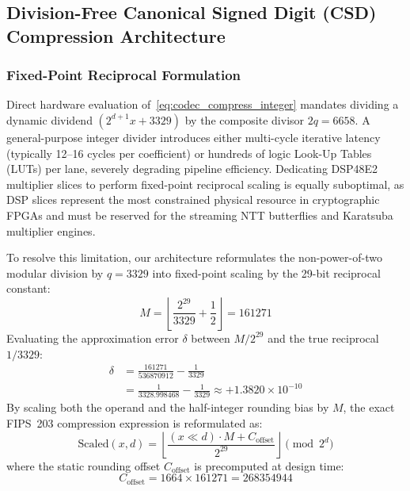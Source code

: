 \subsection{Division-Free Canonical Signed Digit (CSD) Compression Architecture}
\label{sec:csd_compression}

\subsubsection{Fixed-Point Reciprocal Formulation}
Direct hardware evaluation of~\eqref{eq:codec_compress_integer} mandates dividing a dynamic dividend $(2^{d+1} x + 3329)$ by the composite divisor $2q = 6658$. A general-purpose integer divider introduces either multi-cycle iterative latency (typically 12--16 cycles per coefficient) or hundreds of logic Look-Up Tables (LUTs) per lane, severely degrading pipeline efficiency. Dedicating DSP48E2 multiplier slices to perform fixed-point reciprocal scaling is equally suboptimal, as DSP slices represent the most constrained physical resource in cryptographic FPGAs and must be reserved for the streaming NTT butterflies and Karatsuba multiplier engines.

To resolve this limitation, our architecture reformulates the non-power-of-two modular division by $q = 3329$ into fixed-point scaling by the 29-bit reciprocal constant:
\begin{equation}
\label{eq:codec_reciprocal_constant}
M = \left\lfloor \frac{2^{29}}{3329} + \frac{1}{2} \right\rfloor = 161271
\end{equation}
Evaluating the approximation error $\delta$ between $M/2^{29}$ and the true reciprocal $1/3329$:
\begin{align}
\label{eq:codec_reciprocal_error}
\delta &= \frac{161271}{536870912} - \frac{1}{3329} \nonumber \\
&= \frac{1}{3328.998468} - \frac{1}{3329} \approx +1.3820 \times 10^{-10}
\end{align}
By scaling both the operand and the half-integer rounding bias by $M$, the exact FIPS~203 compression expression is reformulated as:
\begin{equation}
\label{eq:codec_csd_compression_form}
\text{Scaled}(x, d) = \left\lfloor \frac{(x \ll d) \cdot M + C_{\text{offset}}}{2^{29}} \right\rfloor \pmod{2^d}
\end{equation}
where the static rounding offset $C_{\text{offset}}$ is precomputed at design time:
\begin{equation}
\label{eq:codec_c_offset}
C_{\text{offset}} = 1664 \times 161271 = 268354944
\end{equation}

